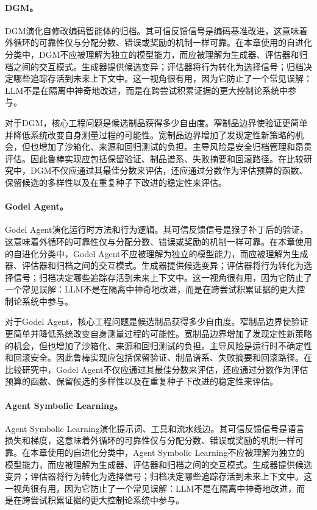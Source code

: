 \paragraph{DGM。} DGM演化自修改编码智能体的归档。其可信反馈信号是编码基准改进，这意味着外循环的可靠性仅与分配分数、错误或奖励的机制一样可靠。在本章使用的自进化分类中，DGM不应被理解为独立的模型能力，而应被理解为生成器、评估器和归档之间的交互模式。生成器提供候选变异；评估器将行为转化为选择信号；归档决定哪些追踪存活到未来上下文中。这一视角很有用，因为它防止了一个常见误解：LLM不是在隔离中神奇地改进，而是在跨尝试积累证据的更大控制论系统中参与。

对于DGM，核心工程问题是候选制品获得多少自由度。窄制品边界使验证更简单并降低系统改变自身测量过程的可能性。宽制品边界增加了发现定性新策略的机会，但也增加了沙箱化、来源和回归测试的负担。主导风险是安全归档管理和昂贵评估。因此鲁棒实现应包括保留验证、制品谱系、失败摘要和回滚路径。在比较研究中，DGM不仅应通过其最佳分数来评估，还应通过分数作为评估预算的函数、保留候选的多样性以及在重复种子下改进的稳定性来评估。

\paragraph{Godel Agent。} Godel Agent演化运行时方法和行为逻辑。其可信反馈信号是猴子补丁后的验证，这意味着外循环的可靠性仅与分配分数、错误或奖励的机制一样可靠。在本章使用的自进化分类中，Godel Agent不应被理解为独立的模型能力，而应被理解为生成器、评估器和归档之间的交互模式。生成器提供候选变异；评估器将行为转化为选择信号；归档决定哪些追踪存活到未来上下文中。这一视角很有用，因为它防止了一个常见误解：LLM不是在隔离中神奇地改进，而是在跨尝试积累证据的更大控制论系统中参与。

对于Godel Agent，核心工程问题是候选制品获得多少自由度。窄制品边界使验证更简单并降低系统改变自身测量过程的可能性。宽制品边界增加了发现定性新策略的机会，但也增加了沙箱化、来源和回归测试的负担。主导风险是运行时不确定性和回滚安全。因此鲁棒实现应包括保留验证、制品谱系、失败摘要和回滚路径。在比较研究中，Godel Agent不仅应通过其最佳分数来评估，还应通过分数作为评估预算的函数、保留候选的多样性以及在重复种子下改进的稳定性来评估。

\paragraph{Agent Symbolic Learning。} Agent Symbolic Learning演化提示词、工具和流水线边。其可信反馈信号是语言损失和梯度，这意味着外循环的可靠性仅与分配分数、错误或奖励的机制一样可靠。在本章使用的自进化分类中，Agent Symbolic Learning不应被理解为独立的模型能力，而应被理解为生成器、评估器和归档之间的交互模式。生成器提供候选变异；评估器将行为转化为选择信号；归档决定哪些追踪存活到未来上下文中。这一视角很有用，因为它防止了一个常见误解：LLM不是在隔离中神奇地改进，而是在跨尝试积累证据的更大控制论系统中参与。

